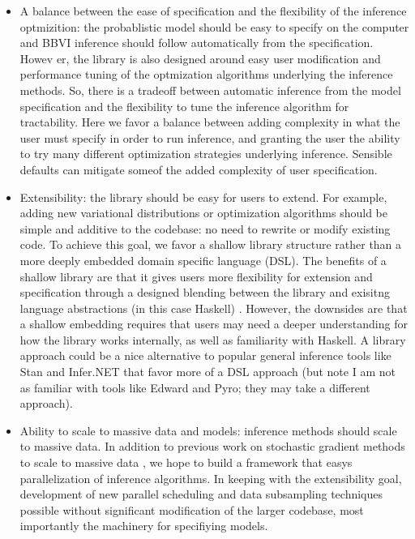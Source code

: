 \documentclass[12pt]{article}
\begin{document}
\begin{itemize}
\item A balance between the ease of specification and the flexibility
  of the inference optmizition: the probablistic model should be easy
  to specify on the computer and BBVI inference should follow
  automatically from the specification. Howev er, the library is also
  designed around easy user modification and performance tuning of the
  optmization algorithms underlying the inference methods. So, there
  is a tradeoff between automatic inference from the model
  specification and the flexibility to tune the inference algorithm
  for tractability. Here we favor a balance between adding complexity
  in what the user must specify in order to run inference, and
  granting the user the ability to try many different optimization
  strategies underlying inference. Sensible defaults can mitigate
  someof the added complexity of user specification.
\item Extensibility: the library should be easy for users to
  extend. For example, adding new variational distributions or
  optimization algorithms should be simple and additive to the
  codebase: no need to rewrite or modify existing code. To achieve
  this goal, we favor a shallow library structure rather than a more
  deeply embedded domain specific language (DSL). The benefits of a
  shallow library are that it gives users more flexibility for
  extension and specification through a designed blending between the
  library and exisitng language abstractions (in this case Haskell)
  . However, the downsides are that a shallow embedding requires that
  users may need a deeper understanding for how the library works
  internally, as well as familiarity with Haskell. A library approach
  could be a nice alternative to popular general inference tools like
  Stan and Infer.NET that favor more of a DSL approach (but note I am
  not as familiar with tools like Edward and Pyro; they may take a
  different approach).
\item Ability to scale to massive data and models: inference methods
  should scale to massive data. In addition to previous work on
  stochastic gradient methods to scale to massive data
  \citep[e.g.,][]{hoffman-2013, ranganath-2014, kuc-2017}, we hope to
  build a framework that easys parallelization of inference
  algorithms. In keeping with the extensibility goal, development of
  new parallel scheduling and data subsampling techniques possible
  without significant modification of the larger codebase, most
  importantly the machinery for specifiying models.
\end{itemize}
\end{document}
